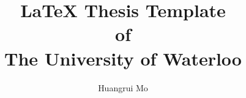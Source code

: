 \title[\LaTeX{} Thesis Template of UW]{\LaTeX{} Thesis Template\\ of\\ The University of Waterloo}%
\author{Huangrui Mo}
